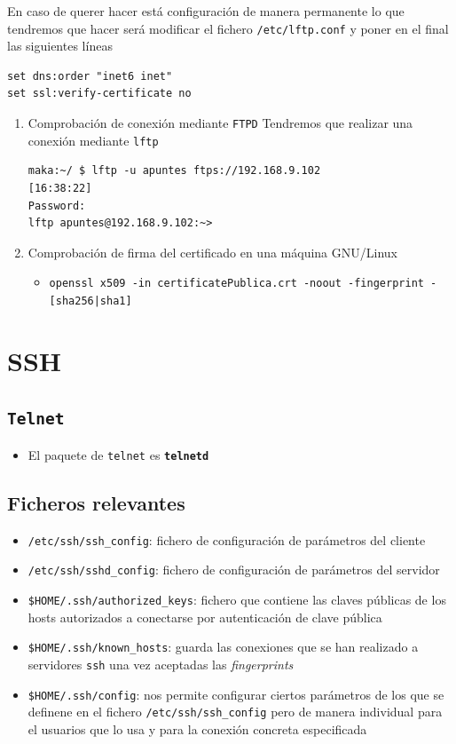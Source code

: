 \documentclass[11pt]{article}
\begin{document}
En caso de querer hacer está configuración de manera permanente lo que tendremos que hacer será modificar el fichero \texttt{/etc/lftp.conf} y poner en el final las siguientes líneas
\begin{verbatim}
set dns:order "inet6 inet"
set ssl:verify-certificate no
\end{verbatim}

\begin{enumerate}
\item Comprobación de conexión mediante \texttt{FTPD}
\label{sec:org626de4c}
Tendremos que realizar una conexión mediante \texttt{lftp}
\begin{verbatim}
maka:~/ $ lftp -u apuntes ftps://192.168.9.102                                                             [16:38:22]
Password: 
lftp apuntes@192.168.9.102:~>
\end{verbatim}


\item Comprobación de firma del certificado en una máquina GNU/Linux
\label{sec:orgc51641e}
\begin{itemize}
\item \texttt{openssl x509 -in certificatePublica.crt -noout -fingerprint -[sha256|sha1]}
\end{itemize}
\end{enumerate}

\section{SSH}
\label{sec:org552942f}
\subsection{\texttt{Telnet}}
\label{sec:orge273e5c}
\begin{itemize}
\item El paquete de \texttt{telnet} es \textbf{\texttt{telnetd}}
\end{itemize}
\subsection{Ficheros relevantes}
\label{sec:orgbf63ce2}
\begin{itemize}
\item \texttt{/etc/ssh/ssh\_config}: fichero de configuración de parámetros del cliente
\item \texttt{/etc/ssh/sshd\_config}: fichero de configuración de parámetros del servidor
\item \texttt{\$HOME/.ssh/authorized\_keys}: fichero que contiene las claves públicas de los hosts autorizados a conectarse por autenticación de clave pública
\item \texttt{\$HOME/.ssh/known\_hosts}: guarda las conexiones que se han realizado a servidores \texttt{ssh} una vez aceptadas las \emph{fingerprints}
\item \texttt{\$HOME/.ssh/config}: nos permite configurar ciertos parámetros de los que se definene en el fichero \texttt{/etc/ssh/ssh\_config} pero de manera individual para el usuarios que lo usa y para la
conexión concreta especificada
\end{itemize}
\end{document}
